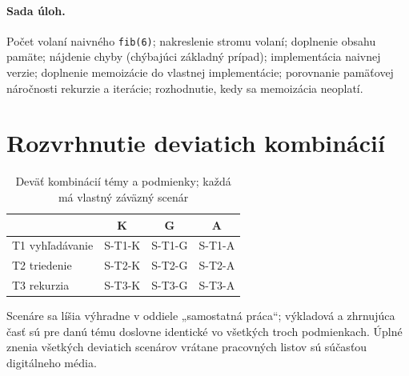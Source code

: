 \paragraph{Sada úloh.} Počet volaní naivného \texttt{fib(6)}; nakreslenie stromu volaní; doplnenie obsahu pamäte; nájdenie chyby (chýbajúci základný prípad); implementácia naivnej verzie; doplnenie memoizácie do vlastnej implementácie; porovnanie pamäťovej náročnosti rekurzie a iterácie; rozhodnutie, kedy sa memoizácia neoplatí.

\section{Rozvrhnutie deviatich kombinácií}

\begin{table}[H]
\centering
\caption{Deväť kombinácií témy a podmienky; každá má vlastný záväzný scenár}
\label{tab:kombinacie}
\small
\begin{tabular}{@{}lccc@{}}
\toprule
 & \textbf{K} & \textbf{G} & \textbf{A} \\
\midrule
T1 vyhľadávanie & S-T1-K & S-T1-G & S-T1-A \\
T2 triedenie    & S-T2-K & S-T2-G & S-T2-A \\
T3 rekurzia     & S-T3-K & S-T3-G & S-T3-A \\
\bottomrule
\end{tabular}
\end{table}

Scenáre sa líšia výhradne v oddiele „samostatná práca“; výkladová a zhrnujúca časť sú pre danú tému doslovne identické vo všetkých troch podmienkach. Úplné znenia všetkých deviatich scenárov vrátane pracovných listov sú súčasťou digitálneho média.
